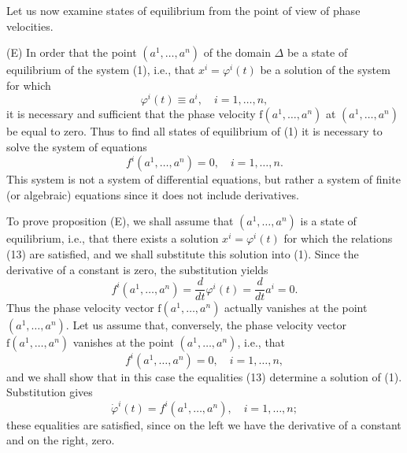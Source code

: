 \documentclass[10pt,a5paper]{book}
\theoremstyle{plain}
\theoremstyle{definition}
\theoremstyle{remark}
\begin{document}
Let us now examine states of equilibrium from the point of view of phase velocities.

(E) In order that the point $\left(a^{1}, \ldots, a^{n}\right)$ of the domain $\Delta$ be a state of equilibrium of the system (1), i.e., that $x^{i}=\varphi^{i}(t)$ be a solution of the system for which
\begin{equation*}
\varphi^{i}(t) \equiv a^{i}, \quad i=1, \ldots, n, \tag{13}
\end{equation*}
it is necessary and sufficient that the phase velocity $\mathrm{f}\left(a^{1}, \ldots, a^{n}\right)$ at $\left(a^{1}, \ldots, a^{n}\right)$ be equal to zero. Thus to find all states of equilibrium of (1) it is necessary to solve the system of equations
\[
f^{i}\left(a^{1}, \ldots, a^{n}\right)=0, \quad i=1, \ldots, n .
\]
This system is not a system of differential equations, but rather a system of finite (or algebraic) equations since it does not include derivatives.

To prove proposition (E), we shall assume that $\left(a^{1}, \ldots, a^{n}\right)$ is a state of equilibrium, i.e., that there exists a solution $x^{i}=\varphi^{i}(t)$ for which the relations (13) are satisfied, and we shall substitute this solution into (1). Since the derivative of a constant is zero, the substitution yields
\[
f^{i}\left(a^{1}, \ldots, a^{n}\right)=\frac{d}{d t} \varphi^{i}(t)=\frac{d}{d t} a^{i}=0 .
\]
Thus the phase velocity vector $\mathrm{f}\left(a^{1}, \ldots, a^{n}\right)$ actually vanishes at the point $\left(a^{1}, \ldots, a^{n}\right)$. Let us assume that, conversely, the phase velocity vector $\mathrm{f}\left(a^{1}, \ldots, a^{n}\right)$ vanishes at the point $\left(a^{1}, \ldots, a^{n}\right)$, i.e., that
\[
f^{i}\left(a^{1}, \ldots, a^{n}\right)=0, \quad i=1, \ldots, n,
\]
and we shall show that in this case the equalities (13) determine a solution of (1). Substitution gives
\[
\dot{\varphi}^{i}(t)=f^{i}\left(a^{1}, \ldots, a^{n}\right), \quad i=1, \ldots, n ;
\]
these equalities are satisfied, since on the left we have the derivative of a constant and on the right, zero.
\end{document}
